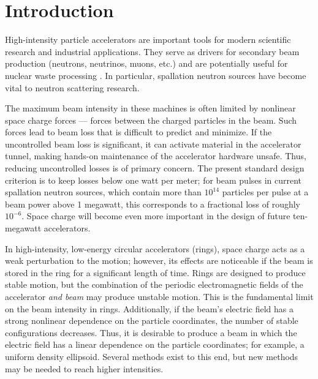 \chapter{Introduction}\label{chap-1}

High-intensity particle accelerators are important tools for modern scientific research and industrial applications. They serve as drivers for secondary beam production (neutrons, neutrinos, muons, etc.) and are potentially useful for nuclear waste processing \cite{Yee-Rendon2021}. In particular, spallation neutron sources have become vital to neutron scattering research.

The maximum beam intensity in these machines is often limited by nonlinear space charge forces — forces between the charged particles in the beam. Such forces lead to beam loss that is difficult to predict and minimize. If the uncontrolled beam loss is significant, it can activate material in the accelerator tunnel, making hands-on maintenance of the accelerator hardware unsafe. Thus, reducing uncontrolled losses is of primary concern. The present standard design criterion is to keep losses below one watt per meter; for beam pulses in current spallation neutron sources, which contain more than $10^{14}$ particles per pulse at a beam power above 1 megawatt, this corresponds to a fractional loss of roughly $10^{-6}$. Space charge will become even more important in the design of future ten-megawatt accelerators. 
 
In high-intensity, low-energy circular accelerators (rings), space charge acts as a weak perturbation to the motion; however, its effects are noticeable if the beam is stored in the ring for a significant length of time. Rings are designed to produce stable motion, but the combination of the periodic electromagnetic fields of the accelerator \textit{and beam} may produce unstable motion. This is the fundamental limit on the beam intensity in rings. Additionally, if the beam's electric field has a strong nonlinear dependence on the particle coordinates, the number of stable configurations decreases. Thus, it is desirable to produce a beam in which the electric field has a linear dependence on the particle coordinates; for example, a uniform density ellipsoid. Several methods exist to this end, but new methods may be needed to reach higher intensities.
 
